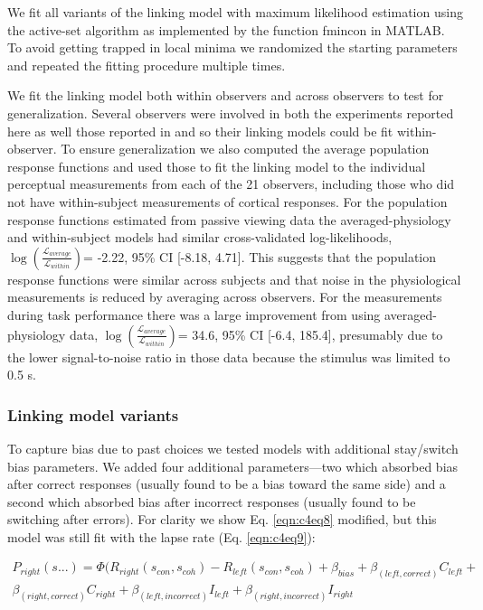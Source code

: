 \documentclass{report}
\begin{document}
We fit all variants of the linking model with maximum likelihood estimation using the active-set algorithm as implemented by the function fmincon in MATLAB. To avoid getting trapped in local minima we randomized the starting parameters and repeated the fitting procedure multiple times. 

We fit the linking model both within observers and across observers to test for generalization. Several observers were involved in both the experiments reported here as well those reported in \citet{Birman2018-sp} and so their linking models could be fit within-observer. To ensure generalization we also computed the average population response functions and used those to fit the linking model to the individual perceptual measurements from each of the 21 observers, including those who did not have within-subject measurements of cortical responses. For the population response functions estimated from passive viewing data the averaged-physiology and within-subject models had similar cross-validated log-likelihoods, $\log(\frac{\mathcal{L}_{average}}{\mathcal{L}_{within}})$= -2.22, 95\% CI [-8.18, 4.71]. This suggests that the population response functions were similar across subjects and that noise in the physiological measurements is reduced by averaging across observers.  For the measurements during task performance there was a large improvement from using averaged-physiology data, $\log(\frac{\mathcal{L}_{average}}{\mathcal{L}_{within}})$= 34.6, 95\% CI [-6.4, 185.4], presumably due to the lower signal-to-noise ratio in those data because the stimulus was limited to 0.5 s.

\subsubsection{Linking model variants}

To capture bias due to past choices \citep{Abrahamyan2016-od,Frund2016-ld} we tested models with additional stay/switch bias parameters. We added four additional parameters—two which absorbed bias after correct responses (usually found to be a bias toward the same side) and a second which absorbed bias after incorrect responses (usually found to be switching after errors). For clarity we show Eq. \ref{eqn:c4eq8} modified, but this model was still fit with the lapse rate (Eq. \ref{eqn:c4eq9}):

\begin{equation}
    \begin{aligned}
    P_{right}(s...)=\Phi(R_{right}(s_{con},s_{coh})-R_{left}(s_{con},s_{coh})+\beta_{bias}+\beta_{(left,correct)}C_{left}+ \\ \beta_{(right,correct)}C_{right}+\beta_{(left,incorrect)}I_{left}+\beta_{(right,incorrect)}I_{right}
    \end{aligned}
\end{equation}
\end{document}
